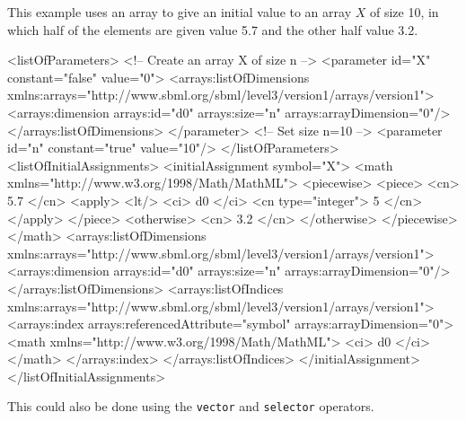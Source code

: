 This example uses an \InitialAssignment array to give an initial value to an array $X$ of size 10, in which half of the elements are given value 5.7 and the other half value 3.2. 

\begin{example}
<listOfParameters>
 <!-- Create an array X of size n -->
    <parameter id="X" constant="false" value="0">
        <arrays:listOfDimensions
            xmlns:arrays="http://www.sbml.org/sbml/level3/version1/arrays/version1">
            <arrays:dimension arrays:id="d0" arrays:size="n" arrays:arrayDimension="0"/>
        </arrays:listOfDimensions>
    </parameter>
    <!-- Set size n=10 -->
    <parameter id="n" constant="true" value="10"/>
</listOfParameters>
<listOfInitialAssignments>
    <initialAssignment symbol="X">
        <math
            xmlns="http://www.w3.org/1998/Math/MathML">
            <piecewise>
                <piece>
                    <cn> 5.7 </cn>
                    <apply>
                        <lt/>
                        <ci> d0 </ci>
                        <cn type="integer"> 5 </cn>
                    </apply>
                </piece>
                <otherwise>
                    <cn> 3.2 </cn>
                </otherwise>
            </piecewise>
        </math>
        <arrays:listOfDimensions
            xmlns:arrays="http://www.sbml.org/sbml/level3/version1/arrays/version1">
            <arrays:dimension arrays:id="d0" arrays:size="n" arrays:arrayDimension="0"/>
        </arrays:listOfDimensions>
        <arrays:listOfIndices
            xmlns:arrays="http://www.sbml.org/sbml/level3/version1/arrays/version1">
            <arrays:index arrays:referencedAttribute="symbol" arrays:arrayDimension="0">
                <math xmlns="http://www.w3.org/1998/Math/MathML">
                    <ci> d0 </ci>
                </math>
            </arrays:index>
        </arrays:listOfIndices>
    </initialAssignment>
</listOfInitialAssignments>
\end{example}

This could also be done using the {\tt vector} and {\tt selector}  operators.

